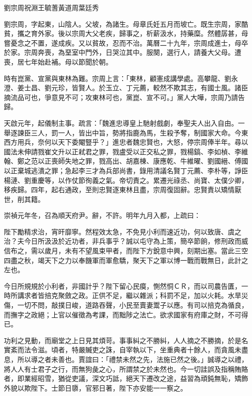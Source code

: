 
\begin{pinyinscope}
劉宗周祝淵王毓蓍黃道周葉廷秀

劉宗周，字起東，山陰人。父坡，為諸生。母章氏妊五月而坡亡。既生宗周，家酷貧，攜之育外家。後以宗周大父老疾，歸事之，析薪汲水，持藥糜。然體孱甚，母嘗憂念之不置，遂成疾。又以貧故，忍而不治。萬曆二十九年，宗周成進士，母卒於家。宗周奔喪，為堊室中門外，日哭泣其中。服闋，選行人，請養大父母。遭喪，居七年始赴補。母以節聞於朝。

時有崑黨、宣黨與東林為難。宗周上言：「東林，顧憲成講學處。高攀龍、劉永澄、姜士昌、劉元珍，皆賢人。於玉立、丁元薦，較然不欺其志，有國士風。諸臣摘流品可也，爭意見不可；攻東林可也，黨崑、宣不可。」黨人大嘩，宗周乃請告歸。

天啟元年，起儀制主事。疏言：「魏進忠導皇上馳射戲劇，奉聖夫人出入自由。一舉逐諫臣三人，罰一人，皆出中旨，勢將指鹿為馬，生殺予奪，制國家大命。今東西方用兵，奈何以天下委閹豎乎？」進忠者魏忠賢也，大怒，停宗周俸半年。尋以國法未伸請戮崔文升以正弒君之罪，戮盧受以正交私之罪，戮楊鎬、李如楨、李維翰、鄭之范以正喪師失地之罪，戮高出、胡嘉棟、康應乾、牛維曜、劉國縉、傅國以正棄城逃潰之罪；急起李三才為兵部尚書，錄用清議名賢丁元薦、李朴等，諍臣楊漣、劉重慶等，以作仗節徇義之氣。帝切責之。累遷光祿丞、尚寶、太僕少卿，移疾歸。四年，起右通政，至則忠賢逐東林且盡，宗周復固辭。忠賢責以矯情厭世，削其籍。

崇禎元年冬，召為順天府尹。辭，不許。明年九月入都，上疏曰：

陛下勵精求治，宵旰靡寧。然程效太急，不免見小利而速近功，何以致唐、虞之治？夫今日所汲汲於近功者，非兵事乎？誠以屯守為上策，簡卒節餉，修刑政而威信布之，需以歲月，未有不望風束甲者，而陛下方銳意中興，刻期出塞。當此三空四盡之秋，竭天下之力以奉饑軍而軍愈驕，聚天下之軍以博一戰而戰無日，此計之左也。

今日所規規於小利者，非國計乎？陛下留心民瘼，惻然恫ＣＲ，而以司農告匱，一時所講求者皆掊克聚斂之政。正供不足，繼以雜派；科罰不足，加以火耗。水旱災傷，一切不問，敲撲日峻，道路吞聲，小民至賣妻鬻子以應。有司以掊克為循良，而撫字之政絕；上官以催徵為考課，而黜陟之法亡。欲求國家有府庫之財，不可得已。

功利之見動，而廟堂之上日見其煩苛。事事糾之不勝糾，人人摘之不勝摘，於是名實紊而法令滋。頃者，特嚴贓吏之誅，自宰執以下，坐重典者十餘人，而貪風未盡息，所以導之者未善也。賈誼曰：「禮禁未然之先，法施已然之後。」誠導之以禮，將人人有士君子之行，而無狗彘之心，所謂禁之於未然也。今一切詿誤及指稱賄賂者，即業經昭雪，猶從吏議，深文巧詆，絕天下遷改之途，益習為頑鈍無恥，矯飾外貌以欺陛下。士節日隳，官邪日著，陛下亦安能一一察之。


\end{pinyinscope}
